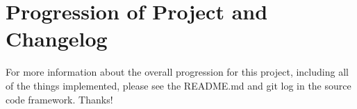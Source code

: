 \documentclass[12pt]{article}
\begin{document}
\section{Progression of Project and Changelog}
For more information about the overall progression for this project, including all of the things implemented, please see the README.md and git log in the source code framework. Thanks!
\end{document}
